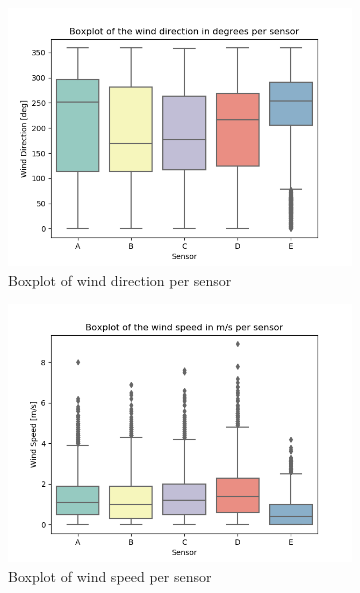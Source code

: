 \documentclass[whitelogo]{tudelft-report}
\begin{document}
\begin{figure}[h!]
  \centering
  \begin{subfigure}[b]{0.4\linewidth}
    \includegraphics[width=\linewidth]{Boxplot of the wind direction in degrees per sensor.png}
    \caption{Boxplot of wind direction per sensor}
  \end{subfigure}
  \begin{subfigure}[b]{0.4\linewidth}
    \includegraphics[width=\linewidth]{Boxplot of wind speed.png}
    \caption{Boxplot of wind speed per sensor}
  \end{subfigure}
  \begin{subfigure}[b]{0.4\linewidth}

\end{subfigure}
\end{figure}
\end{document}
